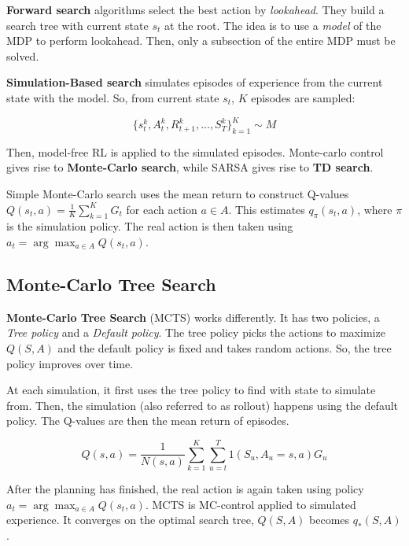 \textbf{Forward search} algorithms select the best action by \textit{lookahead}. They build a search tree with current state $s_t$ at the root. The idea is to use a \textit{model} of the MDP to perform lookahead. Then, only a subsection of the entire MDP must be solved. 

\textbf{Simulation-Based search} simulates episodes of experience from the current state with the model. So, from current state $s_t$, $K$ episodes are sampled:

\begin{equation*}
	\{s_t^k, A_t^k, R_{t+1}^k, ..., S_T^k\}_{k = 1}^K \sim M
\end{equation*}

Then, model-free RL is applied to the simulated episodes. Monte-carlo control gives rise to \textbf{Monte-Carlo search}, while SARSA gives rise to \textbf{TD search}.

Simple Monte-Carlo search uses the mean return to construct Q-values $Q(s_t, a) = \frac{1}{K} \sum_{k = 1}^K G_t$ for each action $a \in A$. This estimates $q_\pi(s_t, a)$, where $\pi$ is the simulation policy. The real action is then taken using $a_t = \arg\max_{a \in A} Q(s_t, a)$.

\subsection{Monte-Carlo Tree Search}

\textbf{Monte-Carlo Tree Search} (MCTS) works differently. It has two policies, a \textit{Tree policy} and a \textit{Default policy}. The tree policy picks the actions to maximize $Q(S, A)$ and the default policy is fixed and takes random actions. So, the tree policy improves over time.

At each simulation, it first uses the tree policy to find with state to simulate from. Then, the simulation (also referred to as rollout) happens using the default policy. The Q-values are then the mean return of episodes.

\begin{equation*}
	Q(s, a) = \frac{1}{N(s, a)} \sum^K_{k = 1} \sum^T_{u = t} 1(S_u, A_u = s, a)G_u
\end{equation*}

After the planning has finished, the real action is again taken using policy $a_t = \arg\max_{a \in A} Q(s_t, a)$. MCTS is MC-control applied to simulated experience. It converges on the optimal search tree, $Q(S, A)$ becomes $q_*(S, A)$.

